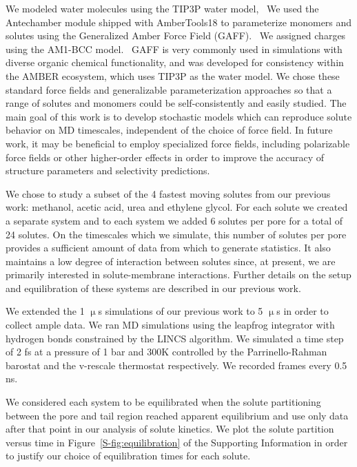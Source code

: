 \documentclass[journal=jctcce,manuscript=article]{achemso}
\begin{document}
  \label{r1_comment2} %
  We modeled water molecules using the TIP3P water model,~\cite{jorgensen_comparison_1983}
  We used the Antechamber module shipped with AmberTools18 to parameterize monomers and 
  solutes using the Generalized Amber Force Field (GAFF).~\cite{wang_development_2004} We 
  assigned charges using the AM1-BCC model.~\cite{jakalian_fast_2000,jakalian_fast_2002}
  GAFF is very commonly used in simulations with diverse organic chemical functionality, 
  and was developed for consistency within the AMBER ecosystem, which uses TIP3P as the
  water model. We chose these standard force fields and generalizable parameterization 
  approaches so that a range of solutes and monomers could be self-consistently and easily 
  studied. The main goal of this work is to develop stochastic models which can reproduce
  solute behavior on MD timescales, independent of the choice of force field. In future 
  work, it may be beneficial to employ specialized force fields, including polarizable 
  force fields or other higher-order effects in order to improve the accuracy of structure 
  parameters and selectivity predictions.
  
  We chose to study a subset of the 4 fastest moving solutes from our previous
  work: methanol, acetic acid, urea and ethylene glycol. For each solute we 
  created a separate system and to each system we added 6 solutes per pore 
  for a total of 24 solutes. On the timescales which we simulate, this number
  of solutes per pore provides a sufficient amount of data from which to 
  generate statistics. It also maintains a low degree of interaction between
  solutes since, at present, we are primarily interested in solute-membrane 
  interactions. Further details on the setup and equilibration of these systems
  are described in our previous work.\cite{coscia_chemically_2019}
  
  We extended the 1 $\upmu$s simulations of our previous work to 5 $\upmu$s in order
  to collect ample data. We ran MD simulations using the leapfrog integrator with 
  hydrogen bonds constrained by the LINCS algorithm. We simulated a time step of 2 fs at
  a pressure of 1 bar and 300K controlled by the Parrinello-Rahman barostat and
  the v-rescale thermostat respectively. We recorded frames every 0.5 ns.
  
  We considered each system to be equilibrated when the solute partitioning between the 
  pore and tail region reached apparent equilibrium and use only data after that point
  in our analysis of solute kinetics. We plot the solute partition versus time in
  Figure~\ref{S-fig:equilibration} of the Supporting Information in order to justify
  our choice of equilibration times for each solute.
  
\end{document}
